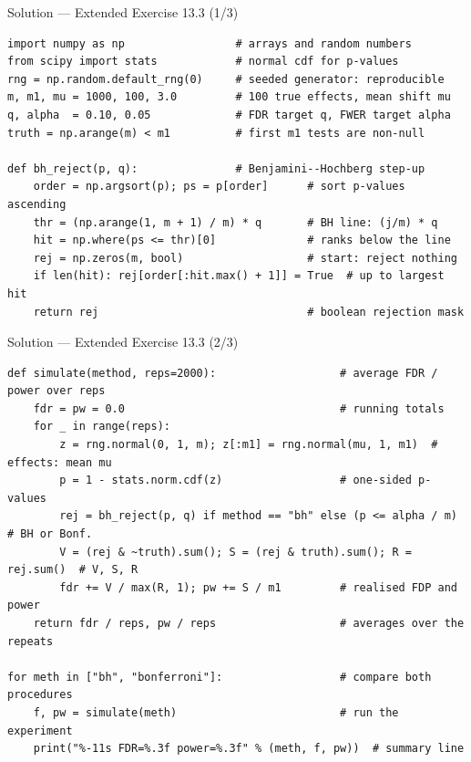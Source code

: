 \documentclass[aspectratio=169,11pt]{beamer}
\begin{document}
\begin{frame}[fragile]{Solution --- Extended Exercise 13.3 (1/3)}
\begin{solutionbox}
\begin{lstlisting}
import numpy as np                 # arrays and random numbers
from scipy import stats            # normal cdf for p-values
rng = np.random.default_rng(0)     # seeded generator: reproducible
m, m1, mu = 1000, 100, 3.0         # 100 true effects, mean shift mu
q, alpha  = 0.10, 0.05             # FDR target q, FWER target alpha
truth = np.arange(m) < m1          # first m1 tests are non-null

def bh_reject(p, q):               # Benjamini--Hochberg step-up
    order = np.argsort(p); ps = p[order]      # sort p-values ascending
    thr = (np.arange(1, m + 1) / m) * q       # BH line: (j/m) * q
    hit = np.where(ps <= thr)[0]              # ranks below the line
    rej = np.zeros(m, bool)                   # start: reject nothing
    if len(hit): rej[order[:hit.max() + 1]] = True  # up to largest hit
    return rej                                # boolean rejection mask
\end{lstlisting}
\end{solutionbox}
\end{frame}

\begin{frame}[fragile]{Solution --- Extended Exercise 13.3 (2/3)}
\begin{solutionbox}
\begin{lstlisting}[basicstyle=\ttfamily\scriptsize]
def simulate(method, reps=2000):                   # average FDR / power over reps
    fdr = pw = 0.0                                 # running totals
    for _ in range(reps):
        z = rng.normal(0, 1, m); z[:m1] = rng.normal(mu, 1, m1)  # effects: mean mu
        p = 1 - stats.norm.cdf(z)                  # one-sided p-values
        rej = bh_reject(p, q) if method == "bh" else (p <= alpha / m)  # BH or Bonf.
        V = (rej & ~truth).sum(); S = (rej & truth).sum(); R = rej.sum()  # V, S, R
        fdr += V / max(R, 1); pw += S / m1         # realised FDP and power
    return fdr / reps, pw / reps                   # averages over the repeats

for meth in ["bh", "bonferroni"]:                  # compare both procedures
    f, pw = simulate(meth)                         # run the experiment
    print("%-11s FDR=%.3f power=%.3f" % (meth, f, pw))  # summary line
\end{lstlisting}
\end{solutionbox}
\end{frame}
\end{document}
